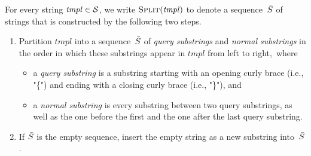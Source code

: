 \begin{definition}
	\label{def:tempSubStrs}
	\normalfont
	For every string $\mathit{tmpl} \in \mathcal{S}$,
	we write $\textsc{Split}(\mathit{tmpl})$ to denote a sequence~$\bar{S}$ of strings that is constructed by the following
		two %
	steps.%
%
\vspace{-2mm} %
%
	\begin{enumerate}
		\item
		Partition $\mathit{tmpl}$ into a sequence~$\bar{S}$ of \emph{query substrings} and \emph{normal substrings} in the order in which these substrings appear in $\mathit{tmpl}$ from left to right,~where
		\begin{itemize}
			\item a \emph{query substring} is a substring
				starting with an opening curly brace (i.e., "\{") and ending with a closing curly brace (i.e., "\}"), and
			\item a \emph{normal substring} is every substring between two query substrings, as well as
				the one before the first and the one
			after the last query substring.
		\end{itemize}

		\item 
		If $\bar{S}$ is the empty sequence, insert the empty string as a new substring into~$\bar{S}$.

% 
	\end{enumerate}
\end{definition}

